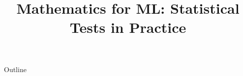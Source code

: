 \documentclass[xcolor=dvipsnames,compress,t,pdf,9pt]{beamer}
\title[\insertframenumber /\inserttotalframenumber]{Mathematics for ML: Statistical Tests in Practice}
\begin{document}
	\begin{frame}
	\titlepage
	\end{frame}

	\begin{frame}{Outline}
	    \tableofcontents
	\end{frame}

	
	
	
	
\end{document}
